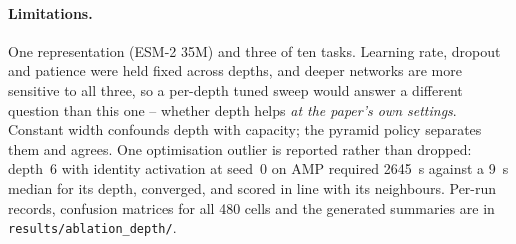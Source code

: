 \documentclass[11pt,a4paper]{article}
\begin{document}
\paragraph{Limitations.} One representation (ESM-2 35M) and three of ten tasks. Learning
rate, dropout and patience were held fixed across depths, and deeper networks are more
sensitive to all three, so a per-depth tuned sweep would answer a different question than
this one -- whether depth helps \emph{at the paper's own settings}. Constant width
confounds depth with capacity; the pyramid policy separates them and agrees. One
optimisation outlier is reported rather than dropped: depth~6 with identity activation at
seed~0 on AMP required \SI{2645}{\second} against a \SI{9}{\second} median for its depth,
converged, and scored in line with its neighbours. Per-run records, confusion matrices for
all 480 cells and the generated summaries are in \texttt{results/ablation\_depth/}.
\end{document}
